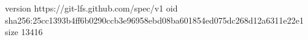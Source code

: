version https://git-lfs.github.com/spec/v1
oid sha256:25cc1393b4ff6b0290ccb3e96958ebd08ba601854ed075dc268d12a6311e22e1
size 13416
